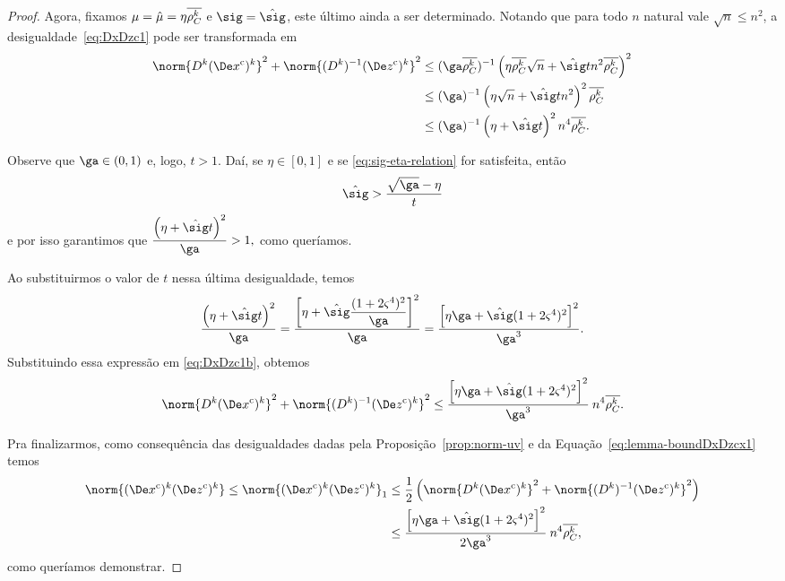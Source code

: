 \begin{proof}
Agora, fixamos $\mu = \hat{\mu} =\eta \overline{\rho_C^{k}} $ e $\sig = \nextsig$, este último ainda a ser determinado. Notando que para todo $n$ natural vale $\sqrt{n} \leq n^{2}$, a desigualdade~\eqref{eq:DxDzc1} pode ser transformada em
\begin{align}
	\norm{\Dk\Dekcox}^{2} + \norm{\Dik\Dekcoz}^{2}
							& \leq (\ga\rhoCkb )^{-1}\left(\eta\rhoCkb \sqrt{n} +{\nextsig} t n^{2}\rhoCkb \right)^{2} \notag \\
							& \leq (\ga)^{-1}\left(\eta\sqrt{n} +{\nextsig} t n^{2}\right)^{2}\rhoCkb \notag \\
							& \leq (\ga)^{-1}\left(\eta +{\nextsig} t \right)^{2}n^{4}\rhoCkb . \label{eq:DxDzc1b}	
\end{align}



Observe que $\ga\in(0,1)$ e, logo, $t > 1$.  Daí, se $\eta\in[0,1]$ e   se \eqref{eq:sig-eta-relation} for satisfeita, então 
\[
\nextsig > \dfrac{\sqrt{\ga} - \eta}{t}
\]
e por isso garantimos que 
$
	\dfrac{\left(\eta +{\nextsig} t \right)^{2}}{\ga} >1,
$
como queríamos.

Ao substituirmos o valor de $t$ nessa última desigualdade, temos 
\[
	\dfrac{\left(\eta +{\nextsig} t \right)^{2}}{\ga} = \dfrac{\left[\eta + \nextsig\dfrac{(1+2\bdxzstar^{4})^{2}}{\ga}\right]^{2}}{\ga} = \dfrac{\left[\eta\ga + \nextsig(1+2\bdxzstar^{4})^{2}\right]^{2}}{\ga^{3}}.
\] 
Substituindo essa expressão em 	\eqref{eq:DxDzc1b}, obtemos
\begin{equation}\label{eq:lemma-boundDxDzcx1}
		\norm{\Dk\Dekcox}^{2} + \norm{\Dik\Dekcoz}^{2} \leq \dfrac{\left[\eta\ga + \nextsig(1+2\bdxzstar^{4})^{2}\right]^{2}}{\ga^{3}} \: n^{4}\rhoCkb.
	\end{equation}

Pra finalizarmos, como consequência  das desigualdades dadas pela Proposição~\ref{prop:norm-uv} e da Equação~\eqref{eq:lemma-boundDxDzcx1} temos
\[
\begin{aligned}  				 
	\norm{ \Dekcox  \Dekcoz  } \leq \norm{ \Dekcox  \Dekcoz  }_{1}   & \leq \frac{1}{2}\left(\norm{\Dk \Dekcox}^{2} + \norm{\Dik  \Dekcoz  }^{2}\right) \notag
  					\\ 
  					& \leq \dfrac{\left[\eta\ga + \nextsig(1+2\bdxzstar^{4})^{2}\right]^{2}}{2\ga^{3}} \: n^{4}\rhoCkb,
\end{aligned}
\]
como queríamos demonstrar.
\end{proof}


